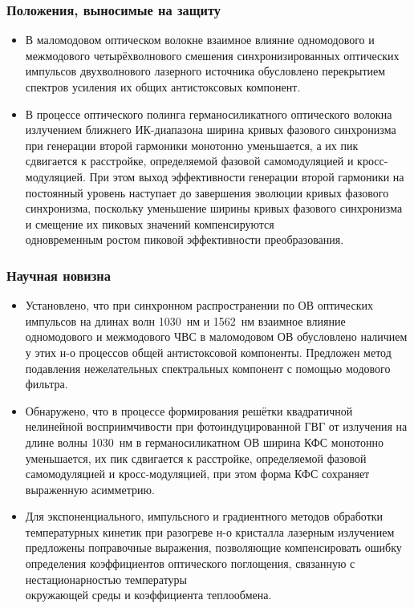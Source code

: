 \begin{frame}
	\frametitle{Положения, выносимые на защиту}
	\begin{itemize}
		\setlength{\itemsep}{0.5em}
		\item В маломодовом оптическом волокне взаимное влияние одномодового и межмодового четырёхволнового смешения синхронизированных оптических импульсов двухволнового лазерного источника обусловлено перекрытием спектров усиления их общих антистоксовых компонент.
		\item В процессе оптического полинга германосиликатного оптического волокна излучением ближнего ИК-диапазона ширина кривых фазового синхронизма при генерации второй гармоники монотонно уменьшается, а их пик сдвигается к расстройке, определяемой фазовой самомодуляцией и кросс-модуляцией. При этом выход эффективности генерации второй гармоники на постоянный уровень наступает до завершения эволюции кривых фазового синхронизма, поскольку уменьшение ширины кривых фазового синхронизма и смещение их пиковых значений компенсируются\\ одновременным ростом пиковой эффективности преобразования.
	\end{itemize}
\end{frame}

\begin{frame}
    \frametitle{Научная новизна}
    \begin{itemize}
    	\setlength{\itemsep}{0.5em}
        \item Установлено, что при синхронном распространении по ОВ оптических импульсов на длинах волн 1030~нм и 1562~нм взаимное влияние одномодового и межмодового ЧВС в маломодовом ОВ обусловлено наличием у этих н-о процессов общей антистоксовой компоненты. Предложен метод подавления нежелательных спектральных компонент с помощью модового фильтра.
        
        \item Обнаружено, что в процессе формирования решётки квадратичной нелинейной восприимчивости при фотоиндуцированной ГВГ от излучения на длине волны 1030~нм в германосиликатном ОВ ширина КФС монотонно уменьшается, их пик сдвигается к расстройке, определяемой фазовой самомодуляцией и кросс-модуляцией, при этом форма КФС сохраняет выраженную асимметрию.  
        
        \item Для экспоненциального, импульсного и градиентного методов обработки температурных кинетик при разогреве н-о кристалла лазерным излучением предложены поправочные выражения, позволяющие компенсировать ошибку определения коэффициентов оптического поглощения, связанную с нестационарностью температуры\\окружающей среды и коэффициента теплообмена.
    \end{itemize}
\end{frame}

